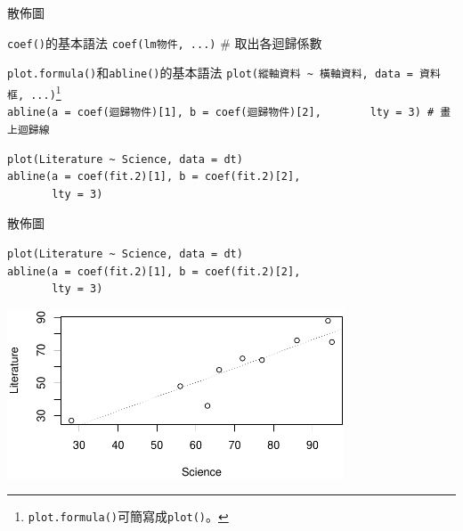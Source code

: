 \documentclass[12pt, aspectratio=43]{beamer}
\let\oldfootnote\footnote
\renewcommand\footnote[1]{\hspace{-0.3em}\oldfootnote{\ignorespaces#1}\hspace{0.3em}}
\begin{document}
\begin{frame}[fragile]{散佈圖}

\begin{block}{\texttt{coef()}的基本語法}
\verb+coef(lm物件, ...)+  \# 取出各迴歸係數
\end{block}

\begin{block}{\texttt{plot.formula()}和\texttt{abline()}的基本語法}
\verb+plot(縱軸資料 ~ 橫軸資料, data = 資料框, ...)+\oldfootnote{\texttt{plot.formula()}可簡寫成\texttt{plot()}。}\\
\verb+abline(a = coef(迴歸物件)[1], b = coef(迴歸物件)[2],+
\verb+       lty = 3) # 畫上迴歸線 +
\end{block}

\begin{verbatim}
plot(Literature ~ Science, data = dt)
abline(a = coef(fit.2)[1], b = coef(fit.2)[2],
       lty = 3)
\end{verbatim}
\end{frame}

\begin{frame}[fragile]{散佈圖}

\begin{verbatim}
plot(Literature ~ Science, data = dt)
abline(a = coef(fit.2)[1], b = coef(fit.2)[2],
       lty = 3)
\end{verbatim}

\begin{center}
\includegraphics[width=0.75\textwidth]{Rplot-sct.pdf}
\end{center}
\end{frame}

%




\end{document}
